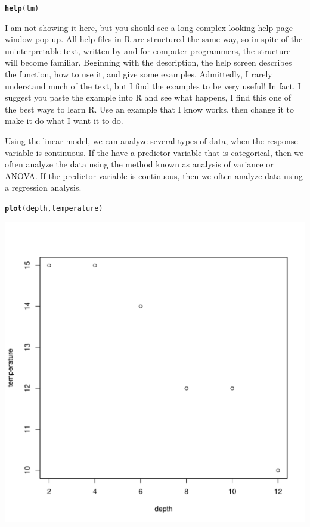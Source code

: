 \documentclass{tufte-handout}\usepackage[]{graphicx}\usepackage[]{xcolor}
\makeatletter
\def\maxwidth{ %
  \ifdim\Gin@nat@width>\linewidth
    \linewidth
  \else
    \Gin@nat@width
  \fi
}
\newcommand{\hlstd}[1]{\textcolor[rgb]{0.345,0.345,0.345}{#1}}%
\newcommand{\hlkwd}[1]{\textcolor[rgb]{0.737,0.353,0.396}{\textbf{#1}}}%
\newenvironment{kframe}{%
 \def\at@end@of@kframe{}%
 \ifinner\ifhmode%
  \def\at@end@of@kframe{\end{minipage}}%
  \begin{minipage}{\columnwidth}%
 \fi\fi%
 \def\FrameCommand##1{\hskip\@totalleftmargin \hskip-\fboxsep
 \colorbox{shadecolor}{##1}\hskip-\fboxsep
     \hskip-\linewidth \hskip-\@totalleftmargin \hskip\columnwidth}%
 \MakeFramed {\advance\hsize-\width
   \@totalleftmargin\z@ \linewidth\hsize
   \@setminipage}}%
 {\par\unskip\endMakeFramed%
 \at@end@of@kframe}
\newenvironment{knitrout}{}{} %
\makeatother
\begin{document}
\begin{knitrout}
\color{fgcolor}\begin{kframe}
\begin{alltt}
\hlkwd{help}\hlstd{(lm)}
\end{alltt}
\end{kframe}
\end{knitrout}

I am not showing it here, but you should see a long complex looking help page window pop up. All help files in R are structured the same way, so in spite of the uninterpretable text, written by and for computer programmers, the structure will become familiar. Beginning with the description, the help screen describes the function, how to use it, and give some examples. Admittedly, I rarely understand much of the text, but I find the examples to be very useful! In fact, I suggest you paste the example into R and see what happens, I find this one of the best ways to learn R. Use an example that I know works, then change it to make it do what I want it to do.

Using the linear model, we can analyze several types of data, when the response variable is continuous. If the have a predictor variable that is categorical, then we often analyze the data using the method known as analysis of variance or ANOVA. If the predictor variable is continuous, then we often analyze data using a regression analysis. 


\begin{knitrout}
\color{fgcolor}\begin{kframe}
\begin{alltt}
\hlkwd{plot}\hlstd{(depth, temperature)}
\end{alltt}
\end{kframe}
\includegraphics[width=\maxwidth]{figure/unnamed-chunk-17-1} 
\end{knitrout}
\end{document}
